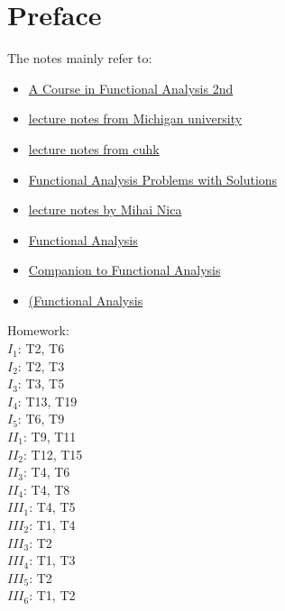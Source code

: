 \chapter*{Preface}

The notes mainly refer to:
\begin{itemize}
    \item \href{}{A Course in Functional Analysis 2nd}
    \item \href{https://users.math.msu.edu/users/banelson/teaching/920/chI_notes.pdf}{lecture notes from Michigan university}
    \item \href{https://www.math.cuhk.edu.hk/course_builder/1415/math5011/functional%20Analysis%202014.pdf}{lecture notes from cuhk}
    \item \href{https://thichchaytron.files.wordpress.com/2013/10/functional-problems-anhle-full-www-mathvn-com.pdf}{Functional Analysis Problems with Solutions}
    \item \href{https://www.math.utoronto.ca/mnica/oral/func_notes.pdf}{lecture notes by Mihai Nica}
    \item \href{https://users.math.msu.edu/users/banelson/conferences/GOALS/notes/KU%20Leuven.pdf}{Functional Analysis}
    \item \href{https://web.pdx.edu/~erdman/CFA/functional_analysis_pdf.pdf}{Companion to Functional Analysis}
    \item \href{https://www.ucl.ac.uk/~ucahad0/3103_handout_1.pdf}{(Functional Analysis}
\end{itemize}


Homework:\\
$I_1$: T2, T6\\
$I_2$: T2, T3\\
$I_3$: T3, T5\\
$I_4$: T13, T19\\
$I_5$: T6, T9\\
$II_1$: T9, T11\\
$II_2$: T12, T15\\
$II_3$: T4, T6\\
$II_4$: T4, T8\\
$III_1$: T4, T5\\
$III_2$: T1, T4\\
$III_3$: T2\\
$III_4$: T1, T3\\
$III_5$: T2\\
$III_6$: T1, T2\\
